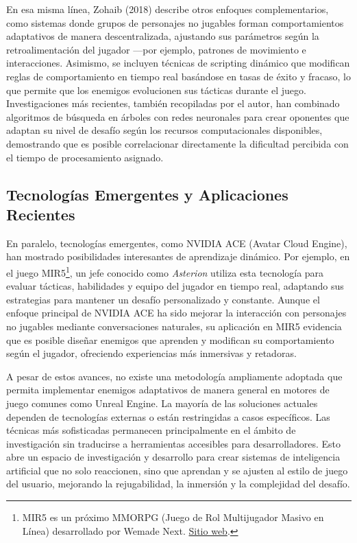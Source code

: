 \documentclass[informe]{upropuesta}
\begin{document}
En esa misma línea, Zohaib (2018) describe otros enfoques complementarios, como sistemas donde grupos de personajes no jugables forman comportamientos adaptativos de manera descentralizada, ajustando sus parámetros según la retroalimentación del jugador —por ejemplo, patrones de movimiento e interacciones. Asimismo, se incluyen técnicas de scripting dinámico que modifican reglas de comportamiento en tiempo real basándose en tasas de éxito y fracaso, lo que permite que los enemigos evolucionen sus tácticas durante el juego. Investigaciones más recientes, también recopiladas por el autor, han combinado algoritmos de búsqueda en árboles con redes neuronales para crear oponentes que adaptan su nivel de desafío según los recursos computacionales disponibles, demostrando que es posible correlacionar directamente la dificultad percibida con el tiempo de procesamiento asignado.

\subsection{Tecnologías Emergentes y Aplicaciones Recientes}

En paralelo, tecnologías emergentes, como NVIDIA ACE (Avatar Cloud Engine), han mostrado posibilidades interesantes de aprendizaje dinámico. Por ejemplo, en el juego MIR5\footnote{MIR5 es un próximo MMORPG (Juego de Rol Multijugador Masivo en Línea) desarrollado por Wemade Next. \href{https://www.invenglobal.com/articles/19158/wemade-next-to-develop-an-ai-boss-in-mir5-in-collaboration-with-nvidia}{Sitio web}.}, un jefe conocido como \textit{Asterion} utiliza esta tecnología para evaluar tácticas, habilidades y equipo del jugador en tiempo real, adaptando sus estrategias para mantener un desafío personalizado y constante. Aunque el enfoque principal de NVIDIA ACE ha sido mejorar la interacción con personajes no jugables mediante conversaciones naturales, su aplicación en MIR5 evidencia que es posible diseñar enemigos que aprenden y modifican su comportamiento según el jugador, ofreciendo experiencias más inmersivas y retadoras.

A pesar de estos avances, no existe una metodología ampliamente adoptada que permita implementar enemigos adaptativos de manera general en motores de juego comunes como Unreal Engine. La mayoría de las soluciones actuales dependen de tecnologías externas o están restringidas a casos específicos. Las técnicas más sofisticadas permanecen principalmente en el ámbito de investigación sin traducirse a herramientas accesibles para desarrolladores. Esto abre un espacio de investigación y desarrollo para crear sistemas de inteligencia artificial que no solo reaccionen, sino que aprendan y se ajusten al estilo de juego del usuario, mejorando la rejugabilidad, la inmersión y la complejidad del desafío.
\end{document}
